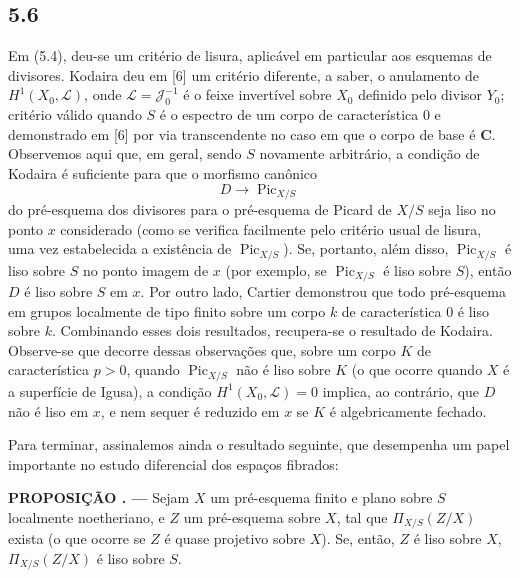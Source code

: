 \documentclass[11pt,twoside,openany]{book}
\numberwithin{equation}{section}
\theoremstyle{plain}
\theoremstyle{definition}
\theoremstyle{remark}
\newcommand{\result}[2]{%
  \par\medskip\noindent\textbf{#1%
  \if\relax\detokenize{#2}\relax\else\space#2\fi. ---}\enspace
}
\begin{document}
\subsection*{5.6}

Em (5.4), deu-se um critério de lisura, aplicável em particular aos esquemas de
divisores. Kodaira deu em [6] um critério diferente, a saber, o anulamento de
$H^1(X_0,\mathcal L)$, onde $\mathcal L=\mathcal J_0^{-1}$ é o feixe
invertível sobre $X_0$ definido pelo divisor $Y_0$; critério válido quando $S$
é o espectro de um corpo de característica 0 e demonstrado em [6] por via
transcendente no caso em que o corpo de base é $\mathbf C$. Observemos aqui
que, em geral, sendo $S$ novamente arbitrário, a condição de Kodaira é
suficiente para que o morfismo canônico
\[
D\longrightarrow\operatorname{Pic}_{X/S}
\]
do pré-esquema dos divisores para o pré-esquema de Picard de $X/S$ seja liso
no ponto $x$ considerado (como se verifica facilmente pelo critério usual de
lisura, uma vez estabelecida a existência de $\operatorname{Pic}_{X/S}$). Se,
portanto, além disso, $\operatorname{Pic}_{X/S}$ é liso sobre $S$ no ponto
imagem de $x$ (por exemplo, se $\operatorname{Pic}_{X/S}$ é liso sobre $S$),
então $D$ é liso sobre $S$ em $x$. Por outro lado, Cartier demonstrou que todo
pré-esquema em grupos localmente de tipo finito sobre um corpo $k$ de
característica 0 é liso sobre $k$. Combinando esses dois resultados, recupera-se
o resultado de Kodaira. Observe-se que decorre dessas observações que, sobre um
corpo $K$ de característica $p>0$, quando $\operatorname{Pic}_{X/S}$ não é
liso sobre $K$ (o que ocorre quando $X$ é a superfície de Igusa), a condição
$H^1(X_0,\mathcal L)=0$ implica, ao contrário, que $D$ não é liso em $x$, e
nem sequer é reduzido em $x$ se $K$ é algebricamente fechado.

Para terminar, assinalemos ainda o resultado seguinte, que desempenha um papel
importante no estudo diferencial dos espaços fibrados:

\result{PROPOSIÇÃO}{5.7} Sejam $X$ um pré-esquema finito e plano sobre $S$
localmente noetheriano, e $Z$ um pré-esquema sobre $X$, tal que
$\Pi_{X/S}(Z/X)$ exista (o que ocorre se $Z$ é quase projetivo sobre $X$). Se,
então, $Z$ é liso sobre $X$, $\Pi_{X/S}(Z/X)$ é liso sobre $S$.
\end{document}
